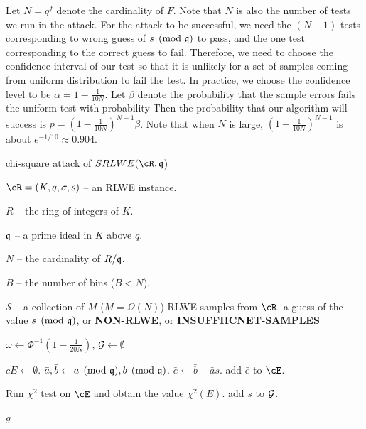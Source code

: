 \documentclass{amsart}
\begin{document}
Let $N = q^f$ denote the cardinality of $F$. Note that $N$ is also the number of tests we run in the attack. For the attack to be successful, we need the $(N-1)$ tests corresponding to wrong guess of $s \pmod{\mathfrak{q}}$ to pass, and the one test corresponding to the correct guess to fail. Therefore, we need to choose the confidence interval of our test so that it is unlikely for a set of samples coming from uniform distribution to fail the test. In practice, we choose the confidence level to be  $\alpha = 1 - \frac{1}{10N}$. Let $\beta$ denote the probability that the sample errors fails the uniform test with probability  Then the probability that our algorithm will success is $p  = (1- \frac{1}{10N})^{N-1} \beta$. Note that when $N$ is large, $(1- \frac{1}{10N})^{N-1}$ is about $e^{-1/10} \approx 0.904$.



\begin{algorithm}[H] \label{alg: chi-square}
\caption{chi-square attack of $SRLWE(\cR,\fq$)}          %
\label{IPR}                           %
\begin{algorithmic}[1]              %
     \Require

     $\cR = (K,q,\sigma, s)$ -- an RLWE instance.

     $R$ -- the ring of integers of $K$.

     $\mathfrak{q}$ -- a prime ideal in $K$ above $q$.

     $N$ -- the cardinality of $R/\mathfrak{q}$.

     $B$ -- the number of bins ($B < N$).

     $\mathcal{S}$ -- a collection of $M$ ($M = \Omega(N)$) RLWE samples from $\cR$.
    \Ensure a guess of the value $s \pmod{\mathfrak{q}}$, or {\bf NON-RLWE}, or {\bf INSUFFIICNET-SAMPLES}

    \State $\omega \gets \Phi^{-1}(1- \frac{1}{20N})$, $\mathcal{G} \gets \emptyset$

        \State $cE \gets \emptyset$.
            \State $\bar{a}, \bar{b} \gets a \pmod{\mathfrak{q}}, b \pmod{\mathfrak{q}}$.
            \State $\bar{e} \gets \bar{b} - \bar{a}s$.
            \State add $\bar{e}$ to $\cE$.
        \EndFor

        \State Run $\chi^2$ test on $\cE$ and obtain the value $\chi^2(E)$.
            \State add $s$ to $\mathcal{G}$.
        \EndIf
    \EndFor


        \Return $g$
    \Else

    \EndIf

\end{algorithmic}
\end{algorithm}
\end{document}
